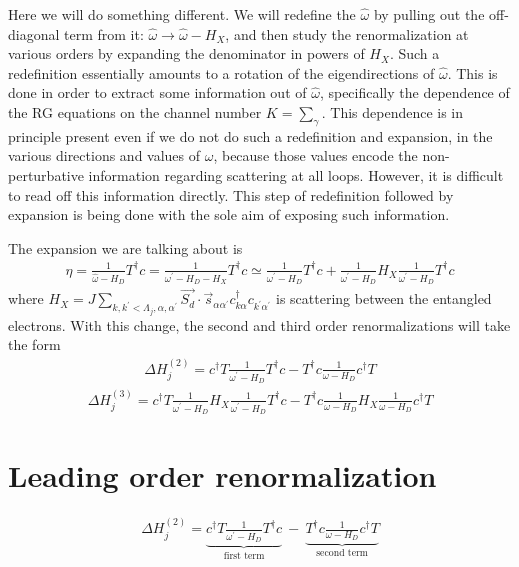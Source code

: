 \documentclass{revtex4-2}
\begin{document}
Here we will do something different. We will redefine the \(\hat \omega\) by pulling out the off-diagonal term from it: \(\hat \omega \to \hat \omega - H_X\), and then study the renormalization at various orders by expanding the denominator in powers of \(H_X\). Such a redefinition essentially amounts to a rotation of the eigendirections of \(\hat \omega\). This is done in order to extract some information out of \(\hat \omega\), specifically the dependence of the RG equations on the channel number \(K = \sum_\gamma\). This dependence is in principle present even if we do not do such a redefinition and expansion, in the various directions and values of \(\omega\), because those values encode the non-perturbative information regarding scattering at all loops. However, it is difficult to read off this information directly. This step of redefinition followed by expansion is being done with the sole aim of exposing such information. 

The expansion we are talking about is
\begin{equation}\begin{aligned}
	\eta = \frac{1}{\hat \omega - H_D}T^\dagger c = \frac{1}{\omega^\prime - H_D - H_X}T^\dagger c \simeq \frac{1}{\omega^\prime - H_D}T^\dagger c + \frac{1}{\omega^\prime - H_D}H_X \frac{1}{\omega^\prime - H_D} T^\dagger c
\end{aligned}\end{equation}
where \(H_X = J \sum_{k,k^\prime < \Lambda_j, \alpha,\alpha^\prime}\vec{S_d}\cdot\vec{s}_{\alpha \alpha^\prime}c^\dagger_{k\alpha}c_{k^\prime\alpha^\prime}\) is scattering between the entangled electrons.
With this change, the second and third order renormalizations will take the form
\begin{equation}\begin{aligned}
	\Delta H^{(2)}_j = c^\dagger T \frac{1}{\omega^\prime - H_D}T^\dagger c - T^\dagger c \frac{1}{\omega - H_D}c^\dagger T
\end{aligned}\end{equation}
\begin{equation}\begin{aligned}
	\Delta H^{(3)}_j = c^\dagger T \frac{1}{\omega^\prime - H_D} H_X \frac{1}{\omega^\prime - H_D} T^\dagger c - T^\dagger c \frac{1}{\omega - H_D} H_X \frac{1}{\omega - H_D} c^\dagger T
\end{aligned}\end{equation}

\section{Leading order renormalization}
\begin{equation}\begin{aligned}
	\Delta H^{(2)}_j = \underbrace{c^\dagger T \frac{1}{\omega^\prime - H_D}T^\dagger c}_\text{first term}~ -~ \underbrace{T^\dagger c \frac{1}{\omega - H_D}c^\dagger T}_\text{second term}
\end{aligned}\end{equation}
\end{document}
